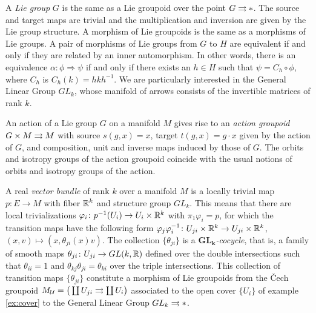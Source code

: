 \begin{example}\label{ex:lie-group}
A \emph{Lie group} $G$ is the same as a Lie groupoid over the point $G\rightrightarrows *$.
The source and target maps are trivial and the multiplication and inversion are given by the Lie group structure.
A morphism of Lie groupoids is the same as a morphisms of Lie groups.
A pair of morphisms of Lie groups from $G$ to $H$ are equivalent if and only if they are related by an inner automorphism.
In other words, there is an equivalence $\alpha\colon\phi\Rightarrow\psi$ if and only if there exists an $h\in H$ such that $\psi=C_h\circ\phi$, where $C_h$ is $C_h(k)=hkh^{-1}$.
We are particularly interested in the General Linear Group $GL_k$, whose manifold of arrows consists of the invertible matrices of rank $k$.
\end{example}

\begin{example}\label{ex:action-gpd}
An action of a Lie group $G$ on a manifold $M$ gives rise to an \emph{action groupoid} $G\times M\rightrightarrows M$ with source $s(g,x) = x$, target $t(g,x) = g\cdot x$ given by the action of $G$, and composition, unit and inverse maps induced by those of $G$.
The orbits and isotropy groups of the action groupoid coincide with the usual notions of orbits and isotropy groups of the action.
\end{example}

\begin{example}\label{ex:vectorBundle}
A real \emph{vector bundle} of rank $k$ over a manifold $M$ is a locally trivial map $p\colon E\to M$ with fiber $\mathbb{R}^k$ and structure group $GL_k$.
This means %
that there are local trivializations $\varphi_i\colon p^{-1}(U_i) \to U_i\times \mathbb{R}^k$ with $\pi_1\varphi_i=p$, for which the transition maps have the following form \(\varphi_j\varphi_i^{-1}\colon U_{ji}\times\mathbb{R}^k\to U_{ji}\times\mathbb{R}^k\), \((x,v)\mapsto (x,\theta_{ji}(x)v)\).
The collection $\{\theta_{ji}\}$ is a \emph{$\bm{GL_k}$-cocycle}, that is, a family of smooth maps $\theta_{ji}\colon U_{ji}\to GL(k,\mathbb{R})$ defined over the double intersections such that $\theta_{ii}=1$ and $\theta_{kj}\theta_{ji}=\theta_{ki}$ over the triple intersections.
This collection of transition maps $\{\theta_{ji}\}$ constitute a morphism of Lie groupoids from the \v Cech groupoid \( M_{\mathcal{U}}=\big(\coprod U_{ji}\rightrightarrows\coprod U_i\big) \) associated to the open cover $\{U_i\}$ of example  \ref{ex:cover} to the General Linear Group $GL_k\rightrightarrows *$.
\end{example}

